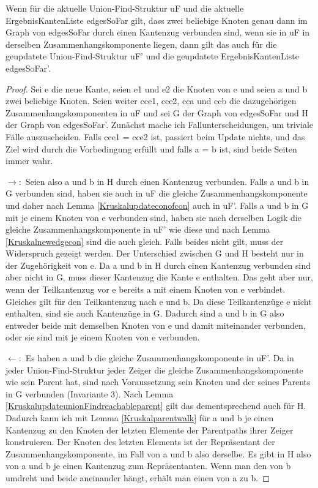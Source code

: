 \begin{lemma}[\KruskalkruskalhelperReachableiffcon]
  Wenn für die aktuelle Union-Find-Struktur uF und die aktuelle ErgebnisKantenListe edgesSoFar gilt,
  dass zwei beliebige Knoten genau dann im Graph von edgesSoFar durch einen Kantenzug verbunden sind, wenn sie in uF in derselben Zusammenhangskomponente liegen,
  dann gilt das auch für die geupdatete Union-Find-Struktur uF' und die geupdatete ErgebnisKantenListe edgesSoFar'.
\end{lemma}
\begin{proof}
  Sei e die neue Kante, seien e1 und e2 die Knoten von e und seien a und b zwei beliebige Knoten.
  Seien weiter cce1, cce2, cca und ccb die dazugehörigen Zusammenhangskomponenten in uF und sei G der Graph von edgesSoFar und H der Graph von edgesSoFar'.
  Zunächst mache ich Fallunterscheidungen, um triviale Fälle auszuscheiden.
  Falls cce1 = cce2 ist, passiert beim Update nichts, und das Ziel wird durch die Vorbedingung erfüllt
  und falls a = b ist, sind beide Seiten immer wahr.

  $\rightarrow:$
  Seien also a und b in H durch einen Kantenzug verbunden.
  Falls a und b in G verbunden sind, haben sie auch in uF die gleiche Zusammenhangskomponente und daher nach Lemma \ref{Kruskalupdateconofcon} auch in uF'.
  Falls a und b in G mit je einem Knoten von e verbunden sind, haben sie nach derselben Logik die gleiche Zusammenhangskomponente in uF' wie diese
  und nach Lemma \ref{Kruskalnewedgecon} sind die auch gleich.
  Falls beides nicht gilt, muss der Widerspruch gezeigt werden.
  Der Unterschied zwischen G und H besteht nur in der Zugehörigkeit von e.
  Da a und b in H durch einen Kantenzug verbunden sind aber nicht in G, muss dieser Kantenzug die Kante e enthalten.
  Das geht aber nur, wenn der Teilkantenzug vor e bereits a mit einem Knoten von e verbindet.
  Gleiches gilt für den Teilkantenzug nach e und b.
  Da diese Teilkantenzüge e nicht enthalten, sind sie auch Kantenzüge in G.
  Dadurch sind a und b in G also entweder beide mit demselben Knoten von e und damit miteinander verbunden, oder sie sind mit je einem Knoten von e verbunden.

  $\leftarrow:$
  Es haben a und b die gleiche Zusammenhangskomponente in uF'.
  Da in jeder Union-Find-Struktur jeder Zeiger die gleiche Zusammenhangskomponente wie sein Parent hat, sind nach Voraussetzung sein Knoten und der seines Parents in G verbunden (Invariante 3).
  Nach Lemma \ref{KruskalupdateunionFindreachableparent} gilt das dementsprechend auch für H.
  Dadurch kann ich mit Lemma \ref{Kruskalparentwalk} für a und b je einen Kantenzug zu den Knoten der letzten Elemente der Parentpaths ihrer Zeiger konstruieren.
  Der Knoten des letzten Elements ist der Repräsentant der Zusammenhangskomponente, im Fall von a und b also derselbe.
  Es gibt in H also von a und b je einen Kantenzug zum Repräsentanten.
  Wenn man den von b umdreht und beide aneinander hängt, erhält man einen von a zu b.
\end{proof}

